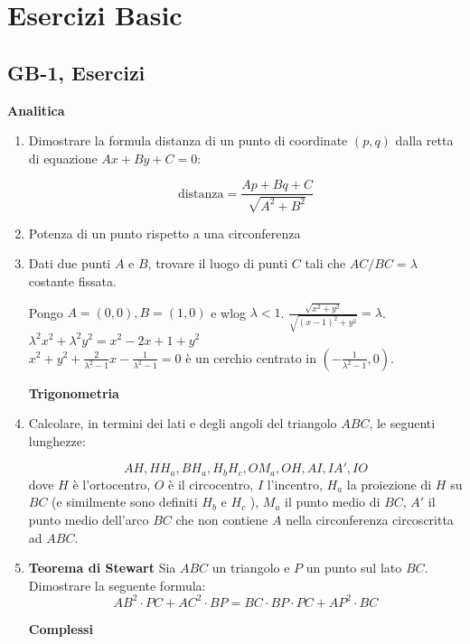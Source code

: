 


\clearpage
\section{Esercizi Basic}
\subsection{GB-1, Esercizi}
\textbf{Analitica}
\begin{enumerate}
\item  Dimostrare la formula distanza di un punto di coordinate $(p,q)$ dalla retta di equazione $Ax+By+C=0$:

$$\text{distanza}=\frac{Ap+Bq+C}{\sqrt{A^2+B^2}}$$

\item  Potenza di un punto rispetto a una circonferenza

\item Dati due punti $A$ e $B$, trovare il luogo di punti $C$ tali che $AC/BC=\lambda$ costante fissata.\\
\begin{sol}
 Pongo $A=(0,0),B=(1,0)$ e wlog $\lambda < 1$. $\frac{\sqrt{x^2+y^2}}{\sqrt{(x-1)^2+y^2}}=\lambda$.\\
 $\lambda^2 x^2 + \lambda^2 y^2 =x^2-2x+1+y^2$\\
 $ x^2+y^2+\frac{2}{\lambda^2-1}x - \frac{1}{\lambda^2-1}=0$
 è un cerchio centrato in $(-\frac{1}{\lambda^2-1},0)$.
\end{sol}


\textbf{Trigonometria}

\item  Calcolare, in termini dei lati e degli angoli del triangolo $ABC$, le seguenti lunghezze: 

$$AH, HH_a , BH_a , H_bH_c , OM_a , OH, AI, IA' , IO$$
dove $H$ è l’ortocentro, $O$ è il circocentro, $I$ l’incentro, $H_a$ la proiezione di $H$ su $BC$ (e similmente
sono definiti $H_b$ e $H_c$ ), $M_a$ il punto medio di $BC$, $A'$ il punto medio dell’arco $BC$ che non contiene
$A$ nella circonferenza circoscritta ad $ABC$.

\item \textbf{Teorema di Stewart} Sia $ABC$ un triangolo e $P$ un punto sul lato $BC$. Dimostrare la seguente formula: 
$$AB^2\cdot PC + AC^2 \cdot BP = BC \cdot BP \cdot PC + AP^2 \cdot BC$$


\textbf{Complessi}


\end{enumerate}
